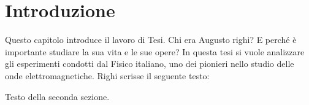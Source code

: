 \chapter*{Introduzione}

Questo capitolo introduce il lavoro di Tesi.
Chi era Augusto righi? E perché è importante studiare la sua vita e le sue opere?
In questa tesi si vuole analizzare gli esperimenti condotti dal Fisico italiano, 
uno dei pionieri nello studio delle onde elettromagnetiche.
Righi scrisse il seguente testo: \cite{righi1897ottica}

Testo della seconda sezione.

